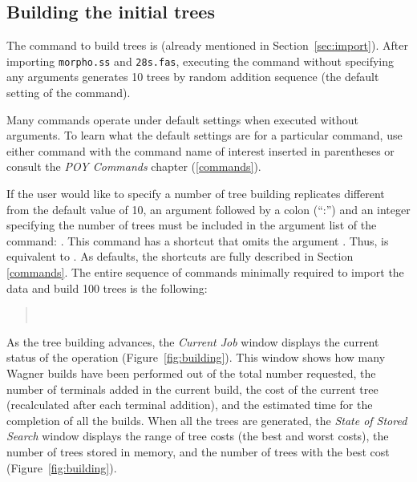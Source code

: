 \subsection{Building the initial trees}

The command to build trees is  (already mentioned in Section~\ref{sec:import}). After importing \texttt{morpho.ss} and \texttt{28s.fas}, executing the command  without specifying any arguments generates 10 trees by random addition sequence (the default setting of the command).

Many \poy commands operate under default settings when executed without arguments. To learn what the default settings are for a particular command, use either  command with the command name of interest inserted in parentheses or consult the \emph{POY Commands} chapter (\ref{commands}).

If the user would like to specify a number of tree building replicates different from the default value of 10, an argument  followed by a colon (``:'') and an integer specifying the number of trees must be included in the argument list of the  command: . This command has a shortcut that omits the argument . Thus,  is equivalent to . As defaults, the shortcuts are fully described in Section \ref{commands}. The entire sequence of commands minimally required to import the data and build 100 trees is the following:

\begin{quote}
 	\\
\end{quote}

As the tree building advances, the \emph{Current Job} window displays the current status of the operation (Figure~\ref{fig:building}). This window shows how many Wagner builds have been performed out of the total number requested, the number of terminals added in the current build, the cost of the current tree (recalculated after each terminal addition), and the estimated time for the completion of all the builds. When all the trees are generated, the \emph{State of Stored Search} window displays the range of tree costs (the best and worst costs), the number of trees stored in memory, and the number of trees with the best cost (Figure~\ref{fig:building}).

